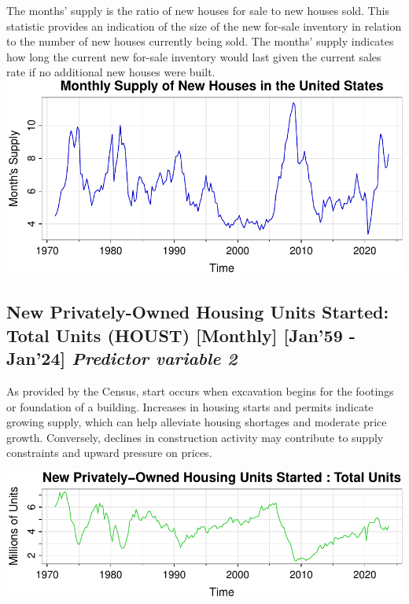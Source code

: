 \documentclass[
  man]{apa6}
\begin{document}
The months' supply is the ratio of new houses for sale to new houses sold. This statistic provides an indication of the size of the new for-sale inventory in relation to the number of new houses currently being sold. The months' supply indicates how long the current new for-sale inventory would last given the current sales rate if no additional new houses were built.
\includegraphics{STAT429Report---Copy_files/figure-latex/unnamed-chunk-3-1.pdf}

\subsection{\texorpdfstring{New Privately-Owned Housing Units Started: Total Units (HOUST) {[}Monthly{]} {[}Jan'59 - Jan'24{]} \emph{Predictor variable 2}}{New Privately-Owned Housing Units Started: Total Units (HOUST) {[}Monthly{]} {[}Jan'59 - Jan'24{]} Predictor variable 2}}\label{new-privately-owned-housing-units-started-total-units-houst-monthly-jan59---jan24-predictor-variable-2}

As provided by the Census, start occurs when excavation begins for the footings or foundation of a building. Increases in housing starts and permits indicate growing supply, which can help alleviate housing shortages and moderate price growth. Conversely, declines in construction activity may contribute to supply constraints and upward pressure on prices.

\includegraphics{STAT429Report---Copy_files/figure-latex/unnamed-chunk-4-1.pdf}
\end{document}
